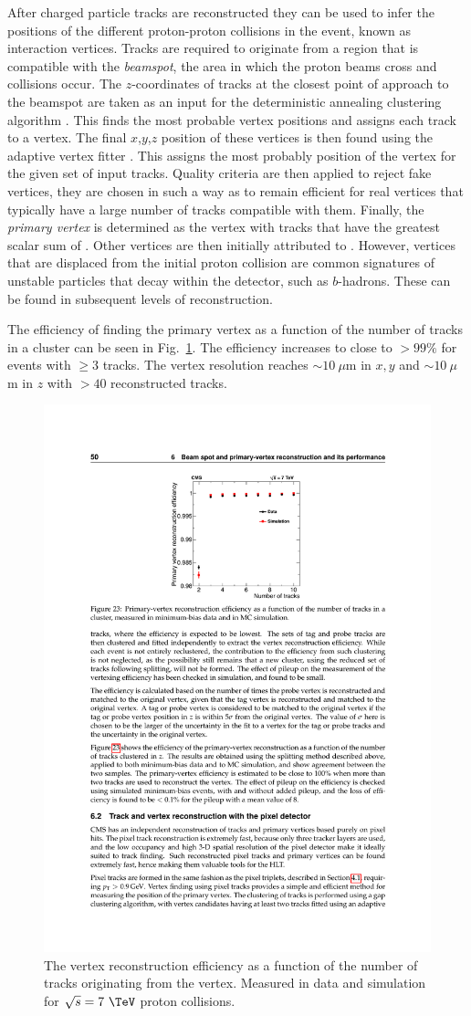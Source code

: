 After charged particle tracks are reconstructed they can be used to
infer the positions of the different proton-proton collisions in the
event, known as interaction vertices. Tracks are required to originate
from a region that is compatible with the \LHC \emph{beamspot}, the area
in which the proton beams cross and collisions occur. The
$z$-coordinates of tracks at the closest point of approach to the
beamspot are taken as an input for the deterministic annealing
clustering algorithm \cite{726788:DA}. This finds the most probable
vertex positions and assigns each track to a vertex. The final
$x$,$y$,$z$ position of these vertices is then found using the
adaptive vertex fitter \cite{Waltenberger:2008zz}. This assigns the
most probably position of the vertex for the given set of input
tracks. Quality criteria are then applied to reject fake vertices,
they are chosen in such a way as to remain efficient for real vertices
that typically have a large number of tracks compatible with them.
Finally, the \emph{primary vertex} is determined as the vertex with
tracks that have the greatest scalar sum of \pt. Other vertices are
then initially attributed to \PU.  However, vertices that are
displaced from the initial proton collision are common signatures of
unstable particles that decay within the detector, such as
$b$-hadrons. These can be found in subsequent levels of
reconstruction.

The efficiency of finding the primary vertex as a function of the
number of tracks in a cluster can be seen in
Fig.~\ref{fig:vertex_reco}. The efficiency increases to close to
$>99\%$ for events with $\ge 3$ tracks. The vertex resolution reaches
$\sim10~\mu$m in $x,y$ and $\sim10~\mu$m in $z$ with $>40$
reconstructed tracks.

\begin{figure}
\begin{center}
\includegraphics[width=0.5\linewidth]{figs/reconstruction/vertexPerformance} \end{center}
\caption{ The vertex reconstruction efficiency as a function of the
number of tracks originating from the vertex. Measured in data and
simulation for $\sqrt{s}=7~\tev$ proton collisions.
\cite{Chatrchyan:2014fea}}
\label{fig:vertex_reco} \end{figure}


